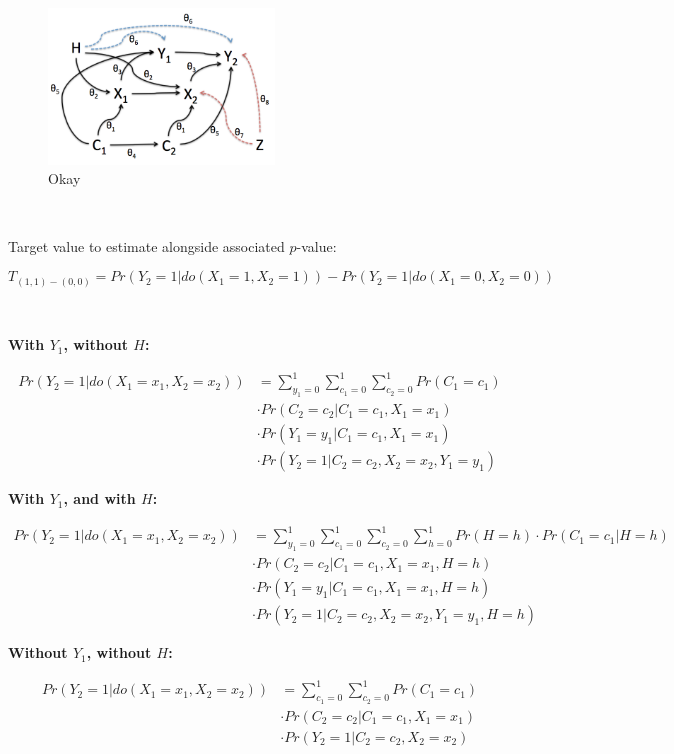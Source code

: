 \documentclass[11pt]{amsart}
\begin{document}
\begin{figure}[h]
\includegraphics[width=6cm]{mypic2.png}
\caption{Okay}
\centering
\end{figure}

$\quad$

Target value to estimate alongside associated $p$-value:

\begin{equation}
T_{(1,1)-(0,0)} =  Pr(Y_{2}=1 | do(X_{1}=1, X_{2}=1))  -   Pr(Y_{2}=1 | do(X_{1}=0, X_{2}=0))
\end{equation}

$\quad$

\textbf{With $Y_1$, without $H$:}

\begin{align*}
  Pr(Y_{2}=1 | do(X_{1}=x_{1}, X_{2}=x_{2})) & =  \sum_{y_{1}=0}^{1} \sum_{c_{1}=0}^{1} \sum_{c_{2}=0}^{1}
 Pr(C_{1}=c_{1}) \\
 &\cdot   Pr(C_{2}=c_{2} | C_{1}=c_{1}, X_{1}=x_{1}) \\
 & \cdot   Pr(Y_{1}=y_{1} | C_{1}=c_{1}, X_{1}=x_{1}) \\
 &\cdot   Pr(Y_{2}=1 | C_{2}=c_{2}, X_{2}=x_{2}, Y_{1}=y_{1})
\end{align*}

\textbf{With $Y_1$, and with $H$:}

\begin{align*}
  Pr(Y_{2}=1 | do(X_{1}=x_{1}, X_{2}=x_{2})) & =  \sum_{y_{1}=0}^{1} \sum_{c_{1}=0}^{1} \sum_{c_{2}=0}^{1} \sum_{h=0}^{1}
 Pr(H=h) \cdot Pr(C_{1}=c_{1} | H=h) \\
 &\cdot   Pr(C_{2}=c_{2} | C_{1}=c_{1}, X_{1}=x_{1}, H=h) \\
 & \cdot   Pr(Y_{1}=y_{1} | C_{1}=c_{1}, X_{1}=x_{1}, H=h) \\
 &\cdot   Pr(Y_{2}=1 | C_{2}=c_{2}, X_{2}=x_{2}, Y_{1}=y_{1}, H=h)
\end{align*}

\textbf{Without $Y_1$, without $H$:}

\begin{align*}
  Pr(Y_{2}=1 | do(X_{1}=x_{1}, X_{2}=x_{2})) & =  \sum_{c_{1}=0}^{1} \sum_{c_{2}=0}^{1}
 Pr(C_{1}=c_{1}) \\
 &\cdot   Pr(C_{2}=c_{2} | C_{1}=c_{1}, X_{1}=x_{1}) \\
 &\cdot   Pr(Y_{2}=1 | C_{2}=c_{2}, X_{2}=x_{2})
\end{align*}
\end{document}
